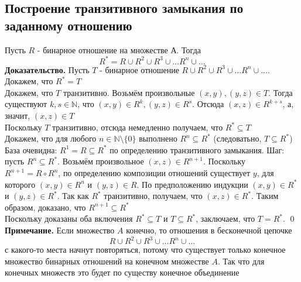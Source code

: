 \documentclass[a4paper]{article}
\begin{document}
\subsection{Построение транзитивного замыкания по заданному отношению}
Пусть $R$ - бинарное отношение на множестве А. Тогда
$$
R^{*}=R \cup R^{2} \cup R^{3} \cup \ldots R^{n} \cup \ldots
$$
\textbf{Доказательство.} Пусть $T$ - бинарное отношение $R \cup R^{2} \cup R^{3} \cup \ldots R^{n} \cup \ldots$. Докажем, что $R^{*}=T$\\[2mm]
Докажем, что $T$ транзитивно. Возьмём произвольные $(x, y),(y, z) \in T$. Тогда существуют $k, s \in \mathbb{N}$, что $(x, y) \in R^{k},(y, z) \in R^{s}$. Отсюда $(x, z) \in R^{k+s}$, а, значит, $(x, z) \in T$\\[2mm]
Поскольку $T$ транзитивно, отсюда немедленно получаем, что $R^{*} \subseteq T$\\[2mm]
Докажем, что для любого $n \in \mathbb{N} \setminus\{0\}$ выполнено $R^{n} \subseteq R^{*}$ (следоватьно, $T \subseteq R^{*}$)\\
База очевидна: $R^{1}=R \subseteq R^{*}$ по определению транзитивного замыкания. Шаг: пусть $R^{n} \subseteq R^{*}$. Возьмём произвольное $(x, z) \in R^{n+1}$. Поскольку $R^{n+1}=R \circ R^{n}$, по определению композиции отношений существует $y$, для которого $(x, y) \in R^{n}$ и $(y, z) \in R$. По предположению индукции $(x, y) \in R^{*}$ и $(y, z) \in R^{*}$. Так как $R^{*}$ транзитивно, получаем, что $(x, z) \in R^{*}$. Таким образом, доказано, что $R^{n+1} \subseteq R^{*}$\\[2mm]
 Поскольку доказаны оба включения $R^{*} \subseteq T$ и $T \subseteq R^{*}$, заключаем, что $T=R^{*}$. \qed\\[2mm]
\textbf{Примечание.} Если множество $A$ конечно, то отношения в бесконечной цепочке $$R \cup R^{2} \cup R^{3} \cup \ldots R^{n} \cup \ldots$$ с какого-то места начнут повторяться, потому что существует только конечное множество бинарных отношений на конечном множестве $A$. Так что для конечных множеств это будет по существу конечное объединение
\end{document}
